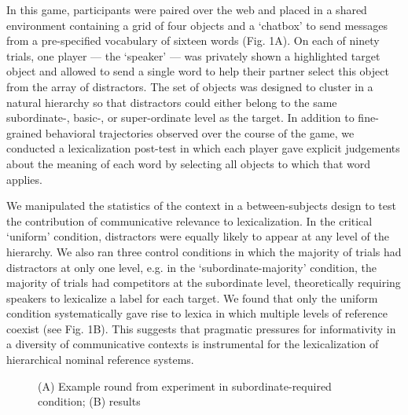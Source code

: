 \documentclass{evolang12}
\begin{document}
In this game, participants were paired over the web and placed in a shared environment containing a grid of four objects and a `chatbox' to send messages from a pre-specified vocabulary of sixteen words (Fig. 1A). On each of ninety trials, one player --- the `speaker' --- was privately shown a highlighted target object and allowed to send a single word to help their partner select this object from the array of distractors. The set of objects was designed to cluster in a natural hierarchy so that distractors could either belong to the same subordinate-, basic-, or super-ordinate level as the target. In addition to fine-grained behavioral trajectories observed over the course of the game, we conducted a lexicalization post-test in which each player gave explicit judgements about the meaning of each word by selecting all objects to which that word applies. %


We manipulated the statistics of the context in a between-subjects design to test the contribution of communicative relevance to lexicalization. In the critical `uniform' condition, distractors were equally likely to appear at any level of the hierarchy. We also ran three control conditions in which the majority of trials had distractors at only one level, e.g. in the `subordinate-majority' condition, the majority of trials had competitors at the subordinate level, theoretically requiring speakers to lexicalize a label for each target. We found that only the uniform condition systematically gave rise to lexica in which multiple levels of reference coexist (see Fig. 1B). This suggests that pragmatic pressures for informativity in a diversity of communicative contexts is instrumental for the lexicalization of hierarchical nominal reference systems. 


\begin{figure}[t]
\begin{center}
\end{center}
\caption{{\footnotesize (A) Example round from experiment in subordinate-required condition; (B) results \label{exp}}}
\end{figure}


 
\end{document}
